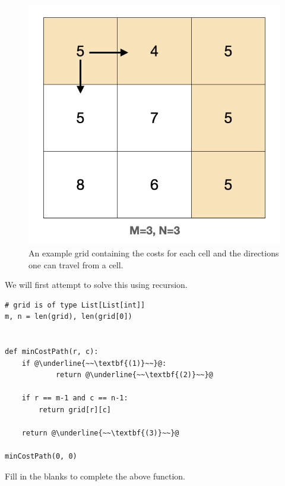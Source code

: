 \documentclass[11pt,addpoints,answers]{exam}
\begin{document}
\begin{questions}
\begin{parts}
\begin{figure}[ht]
\centering
\includegraphics[scale=0.37]{fig/example_grid.png}
\caption{An example grid containing the costs for each cell and the directions one can travel from a cell.}
\label{fig:example_grid}
\end{figure}

We will first attempt to solve this using recursion. 

\begin{lstlisting}[escapechar=@]
# grid is of type List[List[int]]
m, n = len(grid), len(grid[0])


def minCostPath(r, c):
    if @\underline{~~\textbf{(1)}~~}@:
            return @\underline{~~\textbf{(2)}~~}@
                
    if r == m-1 and c == n-1:
        return grid[r][c]

    return @\underline{~~\textbf{(3)}~~}@

minCostPath(0, 0)
\end{lstlisting}
\begin{subparts}
\subpart[3] Fill in the blanks to complete the above function.

    \begin{your_code_solution_outer}[height=1.75cm, width=\textwidth, title={Python code for missing field \textbf{(1)}}]
    \begin{your_code_solution}
    

\end{your_code_solution}
\end{your_code_solution_outer}
\end{subparts}
\end{parts}
\end{questions}
\end{document}
